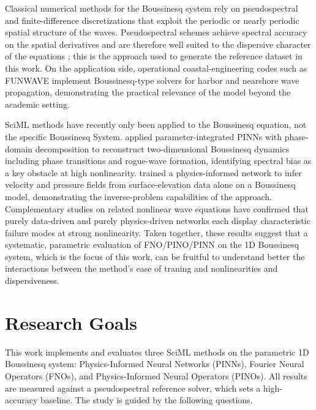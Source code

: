 Classical numerical methods for the Boussinesq system rely on pseudospectral and finite-difference discretizations that exploit the periodic or nearly periodic spatial structure of the waves. Pseudospectral \parencite{trefethen2000spectral} schemes achieve spectral accuracy on the spatial derivatives and are therefore well suited to the dispersive character of the equations \parencite{engsigkarup2012}; this is the approach used to generate the reference dataset in this work. On the application side, operational coastal-engineering codes such as FUNWAVE \parencite{funwave2010} implement Boussinesq-type solvers for harbor and nearshore wave propagation, demonstrating the practical relevance of the model beyond the academic setting.

SciML methods have recently only been applied to the Boussinesq equation, not the specific Boussinesq System. \textcite{zheng2023} applied parameter-integrated PINNs with phase-domain decomposition to reconstruct two-dimensional Boussinesq dynamics including phase transitions and rogue-wave formation, identifying spectral bias as a key obstacle at high nonlinearity. \textcite{wang2024} trained a physics-informed network to infer velocity and pressure fields from surface-elevation data alone on a Boussinesq model, demonstrating the inverse-problem capabilities of the approach. Complementary studies on related nonlinear wave equations \parencite{zhang2024, kumar2025} have confirmed that purely data-driven and purely physics-driven networks each display characteristic failure modes at strong nonlinearity. Taken together, these results suggest that a systematic, parametric evaluation of FNO/PINO/PINN on the 1D Boussinesq system, which is the focus of this work, can be fruitful to understand better the interactions between the method's ease of traning and nonlinearities and dispersiveness.

\section{Research Goals}

This work implements and evaluates three SciML methods on the parametric 1D Boussinesq
system: Physics-Informed Neural Networks (PINNs), Fourier Neural Operators (FNOs), and
Physics-Informed Neural Operators (PINOs). All results are measured against a
pseudospectral reference solver, which sets a high-accuracy baseline. The study is guided
by the following questions.

